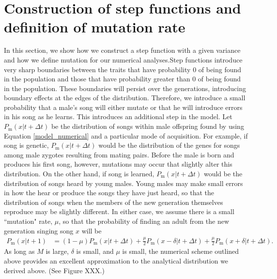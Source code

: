 \documentclass{article}
\newcommand{\x}[1]{\text{#1}}
\begin{document}
\section{Construction of step functions and definition of mutation rate}
In this section, we show how we construct a step function with a given variance and how we define mutation for our numerical analyses.Step functions introduce very sharp boundaries between the traits that have probability $0$ of being found in the population and those that have probability greater than $0$ of being found in the population. These boundaries will persist over the generations, introducing boundary effects at the edges of the distribution. Therefore, we introduce a small probability that a male's song will either mutate or that he will introduce errors in his song as he learns. This introduces an additional step in the model. Let $P_\x{m}\left(x|t+\Delta t\right)$ be the distribution of songs within male offspring found by using Equation \ref{model_numerical} and a particular mode of acquisition. For example, if song is genetic, $P_\x{m}\left(x|t+\Delta t\right)$ would be the distribution of the genes for songs among male zygotes resulting from mating pairs. Before the male is born and produces his first song, however, mutations may occur that slightly alter this distribution. On the other hand, if song is learned, $P_\x{m}\left(x|t+\Delta t\right)$ would be the distribution of songs heard by young males. Young males may make small errors in how the hear or produce the songs they have just heard, so that the distribution of songs when the members of the new generation themselves reproduce may be slightly different. In either case, we assume there is a small ``mutation" rate, $\mu$, so that the probability of finding an adult from the new generation singing song $x$ will be 
\begin{align*}
P_\x{m}(x|t+1)&=(1-\mu)P_\x{m}(x|t+\Delta t)+\frac{\mu}{2}P_\x{m}(x-\delta|t+\Delta t)+\frac{\mu}{2}P_\x{m}(x+\delta|t+\Delta t).
\end{align*}  
As long as $M$ is large, $\delta$ is small, and $\mu$ is small, the numerical scheme outlined above provides an excellent approximation to the analytical distribution we derived above. (See Figure XXX.)
\end{document}
